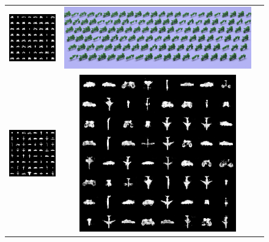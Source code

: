 \begin{figure}[h!]
\begin{center}
\begin{tabular}{ccc}
    \includegraphics[height=\fh]{prgan/fig/bike/300.png} & 
    \includegraphics[height=\fh]{prgan/fig/bike/output.png} \\
    \includegraphics[height=\fh]{prgan/fig/mix/samples.png} & 
    \includegraphics[height=\fh]{prgan/fig/mix/0.png} & 

\end{tabular}
\end{center}
\end{figure}
